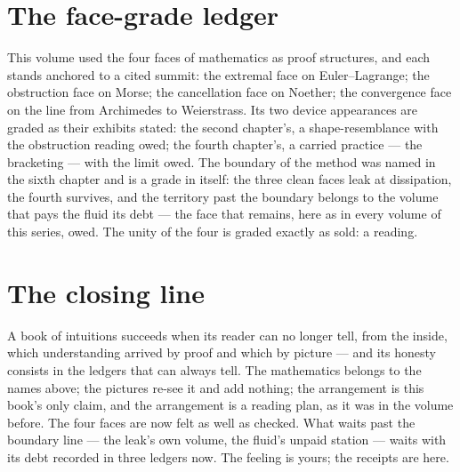 \section*{The face-grade ledger}

This volume used the four faces of mathematics as proof structures, and
each stands anchored to a cited summit: the extremal face on
Euler--Lagrange; the obstruction face on Morse; the cancellation face on
Noether; the convergence face on the line from Archimedes to
Weierstrass. Its two device appearances are graded as their exhibits
stated: the second chapter's, a shape-resemblance with the obstruction
reading owed; the fourth chapter's, a carried practice --- the
bracketing --- with the limit owed. The boundary of the method was named
in the sixth chapter and is a grade in itself: the three clean faces
leak at dissipation, the fourth survives, and the territory past the
boundary belongs to the volume that pays the fluid its debt --- the
face that remains, here as in every volume of this series, owed. The
unity of the four is graded exactly as sold: a reading.

\section*{The closing line}

A book of intuitions succeeds when its reader can no longer tell, from
the inside, which understanding arrived by proof and which by picture
--- and its honesty consists in the ledgers that can always tell. The
mathematics belongs to the names above; the pictures re-see it and add
nothing; the arrangement is this book's only claim, and the arrangement
is a reading plan, as it was in the volume before. The four faces are
now felt as well as checked. What waits past the boundary line --- the
leak's own volume, the fluid's unpaid station --- waits with its debt
recorded in three ledgers now. The feeling is yours; the receipts are
here.
